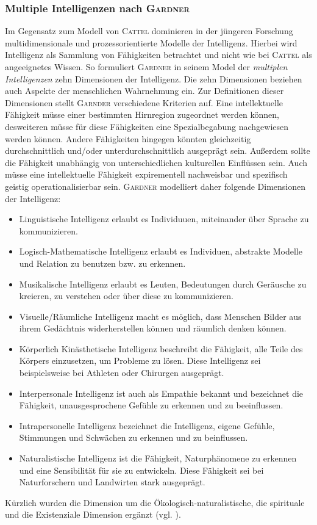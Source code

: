 \documentclass[a4paper, 11pt]{scrartcl}
\begin{document}
\subsubsection{Multiple Intelligenzen nach \textsc{Gardner}}
Im Gegensatz zum Modell von \textsc{Cattel} dominieren in der jüngeren Forschung multidimensionale und prozessorientierte Modelle der Intelligenz. Hierbei wird Intelligenz als Sammlung von Fähigkeiten betrachtet und nicht wie bei \textsc{Cattel} als angeeignetes Wissen. So formuliert \textsc{Gardner} in seinem Model der \textit{multiplen Intelligenzen} zehn Dimensionen der Intelligenz. Die zehn Dimensionen beziehen auch Aspekte der menschlichen Wahrnehmung ein. Zur Definitionen dieser Dimensionen stellt \textsc{Garnder} verschiedene Kriterien auf. Eine intellektuelle Fähigkeit müsse einer bestimmten Hirnregion zugeordnet werden können, desweiteren müsse für diese Fähigkeiten eine Spezialbegabung nachgewiesen werden können. Andere Fähigkeiten hingegen könnten gleichzeitig durchschnittlich und/oder unterdurchschnittlich ausgeprägt sein. Außerdem sollte die Fähigkeit unabhängig von unterschiedlichen kulturellen Einflüssen sein. Auch müsse eine intellektuelle Fähigkeit expirementell nachweisbar und spezifisch geistig operationalisierbar sein. \textsc{Gardner} modelliert daher folgende Dimensionen der Intelligenz:
\begin{itemize}
  \item Linguistische Intelligenz erlaubt es Individuuen, miteinander über Sprache zu kommunizieren.
  \item Logisch-Mathematische Intelligenz erlaubt es Individuen, abstrakte Modelle und Relation zu benutzen bzw. zu erkennen.
  \item Musikalische Intelligenz erlaubt es Leuten, Bedeutungen durch Geräusche zu kreieren, zu verstehen oder über diese zu kommunizieren.
  \item Visuelle/Räumliche Intelligenz macht es möglich, dass Menschen Bilder aus ihrem Gedächtnis widerherstellen können und räumlich denken können.
  \item Körperlich Kinästhetische Intelligenz beschreibt die Fähigkeit, alle Teile des Körpers einzusetzen, um Probleme zu lösen. Diese Intelligenz sei beispielsweise bei Athleten oder Chirurgen ausgeprägt.
  \item Interpersonale Intelligenz ist auch als Empathie bekannt und bezeichnet die Fähigkeit, unausgesprochene Gefühle zu erkennen und zu beeinflussen.
  \item Intrapersonelle Intelligenz bezeichnet die Intelligenz, eigene Gefühle, Stimmungen und Schwächen zu erkennen und zu beinflussen.
  \item Naturalistische Intelligenz ist die Fähigkeit, Naturphänomene zu erkennen und eine Sensibilität für sie zu entwickeln. Diese Fähigkeit sei bei Naturforschern und Landwirten stark ausgeprägt.
\end{itemize}
Kürzlich wurden die Dimension um die Ökologisch-naturalistische, die spirituale und die Existenziale Dimension ergänzt (vgl. \cite{Gardner1993}).
\end{document}
